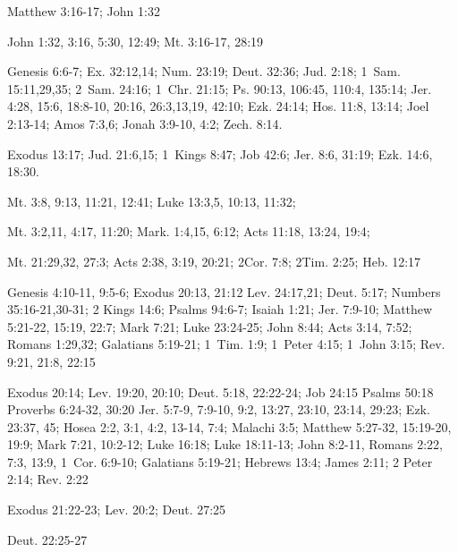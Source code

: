 {\begin{multicols*}{3}
{ 
    Matthew 3:16-17; John 1:32
    
    John 1:32, 3:16, 5:30, 12:49; Mt. 3:16-17, 28:19
    

{}
    Genesis 6:6-7;
    Ex. 32:12,14;
    Num. 23:19;
    Deut. 32:36;
    Jud. 2:18;
    1~Sam. 15:11,29,35;
    2~Sam. 24:16;
    1~Chr. 21:15;
    Ps. 90:13, 106:45, 110:4, 135:14;
    Jer. 4:28, 15:6, 18:8-10, 20:16, 26:3,13,19, 42:10;
    Ezk. 24:14;
    Hos. 11:8, 13:14;
    Joel 2:13-14; 
    Amos 7:3,6;
    Jonah 3:9-10, 4:2;
    Zech. 8:14.

    Exodus 13:17;
    Jud. 21:6,15;
    1~Kings 8:47;
    Job 42:6;
    Jer. 8:6, 31:19;
    Ezk. 14:6, 18:30.
    

    Mt. 3:8, 9:13, 11:21, 12:41;
    Luke 13:3,5, 10:13, 11:32;

    Mt. 3:2,11, 4:17, 11:20;
    Mark. 1:4,15, 6:12;
    Acts 11:18, 13:24, 19:4;
    

    Mt. 21:29,32, 27:3;
    Acts 2:38, 3:19, 20:21;
    2Cor. 7:8;
    2Tim. 2:25;
    Heb. 12:17
    

{}
    Genesis 4:10-11, 9:5-6; 
    Exodus 20:13, 21:12
    Lev. 24:17,21;
    Deut. 5:17;
    Numbers 35:16-21,30-31; 
    2 Kings 14:6;
    Psalms 94:6-7; 
    Isaiah 1:21;
    Jer. 7:9-10;
    Matthew 5:21-22, 15:19, 22:7;
    Mark 7:21;
    Luke 23:24-25;
    John 8:44;
    Acts 3:14, 7:52;
    Romans 1:29,32;
    Galatians 5:19-21;
    1~Tim. 1:9;
    1~Peter 4:15;
    1~John 3:15;
    Rev. 9:21, 21:8, 22:15
    
    Exodus 20:14;
    Lev. 19:20, 20:10;
    Deut. 5:18, 22:22-24;
    Job 24:15
    Psalms 50:18
    Proverbs 6:24-32, 30:20
    Jer. 5:7-9, 7:9-10, 9:2, 13:27, 23:10, 23:14, 29:23;
    Ezk. 23:37, 45;
    Hosea 2:2, 3:1, 4:2, 13-14, 7:4;
    Malachi 3:5;
    Matthew 5:27-32, 15:19-20, 19:9;
    Mark 7:21, 10:2-12;
    Luke 16:18; Luke 18:11-13; 
    John 8:2-11,
    Romans 2:22, 7:3, 13:9, 
    1~Cor. 6:9-10;
    Galatians 5:19-21;
    Hebrews 13:4;
    James 2:11;
    2 Peter 2:14;
    Rev. 2:22
    
    Exodus 21:22-23;
    Lev. 20:2;
    Deut. 27:25
    
    Deut. 22:25-27
    
}
\end{multicols*}}
